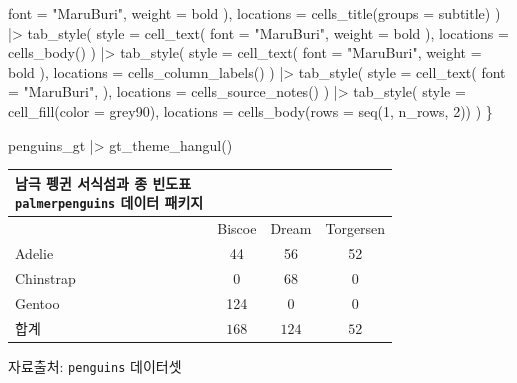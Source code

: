 \documentclass[
  letterpaper,
]{book}
\newenvironment{Shaded}{\begin{snugshade}}{\end{snugshade}}
\newcommand{\AttributeTok}[1]{\textcolor[rgb]{0.40,0.45,0.13}{#1}}
\newcommand{\DecValTok}[1]{\textcolor[rgb]{0.68,0.00,0.00}{#1}}
\newcommand{\FunctionTok}[1]{\textcolor[rgb]{0.28,0.35,0.67}{#1}}
\newcommand{\NormalTok}[1]{\textcolor[rgb]{0.00,0.23,0.31}{#1}}
\newcommand{\SpecialCharTok}[1]{\textcolor[rgb]{0.37,0.37,0.37}{#1}}
\newcommand{\StringTok}[1]{\textcolor[rgb]{0.13,0.47,0.30}{#1}}
\begin{document}
\begin{Shaded}
\begin{Highlighting}[]
        \AttributeTok{font =} \StringTok{"MaruBuri"}\NormalTok{,      }
        \AttributeTok{weight =} \StringTok{\textquotesingle{}bold\textquotesingle{}} 
\NormalTok{      ),}
      \AttributeTok{locations =} \FunctionTok{cells\_title}\NormalTok{(}\AttributeTok{groups =} \StringTok{\textquotesingle{}subtitle\textquotesingle{}}\NormalTok{)}
\NormalTok{    ) }\SpecialCharTok{|\textgreater{}} 
    \FunctionTok{tab\_style}\NormalTok{(}
      \AttributeTok{style =} \FunctionTok{cell\_text}\NormalTok{(}
        \AttributeTok{font =} \StringTok{"MaruBuri"}\NormalTok{,      }
        \AttributeTok{weight =} \StringTok{\textquotesingle{}bold\textquotesingle{}} 
\NormalTok{      ),}
      \AttributeTok{locations =} \FunctionTok{cells\_body}\NormalTok{()}
\NormalTok{    ) }\SpecialCharTok{|\textgreater{}} 
    \FunctionTok{tab\_style}\NormalTok{(}
      \AttributeTok{style =} \FunctionTok{cell\_text}\NormalTok{(}
        \AttributeTok{font =} \StringTok{"MaruBuri"}\NormalTok{,      }
        \AttributeTok{weight =} \StringTok{\textquotesingle{}bold\textquotesingle{}} 
\NormalTok{      ),}
      \AttributeTok{locations =} \FunctionTok{cells\_column\_labels}\NormalTok{()}
\NormalTok{    ) }\SpecialCharTok{|\textgreater{}} 
    \FunctionTok{tab\_style}\NormalTok{(}
      \AttributeTok{style =} \FunctionTok{cell\_text}\NormalTok{(}
        \AttributeTok{font =} \StringTok{"MaruBuri"}\NormalTok{,      }
\NormalTok{      ),}
      \AttributeTok{locations =} \FunctionTok{cells\_source\_notes}\NormalTok{()}
\NormalTok{    ) }\SpecialCharTok{|\textgreater{}} 
    \FunctionTok{tab\_style}\NormalTok{(}
      \AttributeTok{style =} \FunctionTok{cell\_fill}\NormalTok{(}\AttributeTok{color =} \StringTok{\textquotesingle{}grey90\textquotesingle{}}\NormalTok{),}
      \AttributeTok{locations =} \FunctionTok{cells\_body}\NormalTok{(}\AttributeTok{rows =} \FunctionTok{seq}\NormalTok{(}\DecValTok{1}\NormalTok{, n\_rows, }\DecValTok{2}\NormalTok{))}
\NormalTok{    )    }
\NormalTok{\}}

\NormalTok{penguins\_gt }\SpecialCharTok{|\textgreater{}} 
  \FunctionTok{gt\_theme\_hangul}\NormalTok{()}
\end{Highlighting}
\end{Shaded}

\setlength{\LTpost}{0mm}
\begin{longtable*}{l|ccc}
\caption*{
{\large 남극 펭귄 \textbf{서식섬과 종} 빈도표} \\ 
{\small \texttt{palmerpenguins} 데이터 패키지}
} \\ 
\toprule
{} & Biscoe & Dream & Torgersen \\ 
\midrule
Adelie & 44 & 56 & 52 \\ 
Chinstrap & 0 & 68 & 0 \\ 
Gentoo & 124 & 0 & 0 \\ 
\midrule 
\midrule 
합계 & $168$ & $124$ & $52$ \\ 
\bottomrule
\end{longtable*}
\begin{minipage}{\linewidth}
자료출처: \texttt{penguins} 데이터셋\\
\end{minipage}
\end{document}
